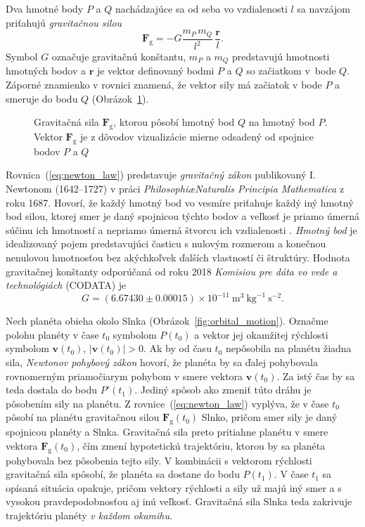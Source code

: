 \documentclass[a4paper, 12pt]{book}
\newcommand{\gidx}{\mathrm g}
\let\vec\mathbf
\begin{document}
Dva hmotné body $P$ a $Q$ nachádzajúce sa od seba vo vzdialenosti $l$ sa 
navzájom priťahujú \emph{gravitačnou silou}
%
\begin{equation}
\label{eq:newton_law}
\vec F_\gidx = -G \frac{m_P \, m_Q}{l^2} \, \frac{\vec r}{l}{.}
\end{equation}
%
Symbol $G$ označuje gravitačnú konštantu, $m_P$ a $m_Q$ predstavujú hmotnosti 
hmotných bodov a $\vec r$ je vektor definovaný bodmi $P$ a $Q$ so začiatkom 
v~bode $Q$.  Záporné znamienko v rovnici znamená, že vektor sily má začiatok 
v bode $P$ a smeruje do bodu $Q$ (Obrázok~\ref{fig:newton_law}).

\begin{figure}[b]
\centering

\caption{Gravitačná sila $\vec F_\gidx$, ktorou pôsobí hmotný bod $Q$ na hmotný 
bod $P$.  Vektor $\vec F_\gidx$ je z dôvodov vizualizácie mierne odsadený od 
spojnice bodov $P$ a $Q$}
\label{fig:newton_law}
\end{figure}

Rovnica~(\ref{eq:newton_law}) predstavuje \emph{gravitačný zákon} 
publikovaný I. Newtonom (1642--1727) v práci \emph{Philosophi\ae Naturalis 
Principia Mathematica} z roku 1687.  Hovorí, že každý hmotný bod vo vesmíre 
priťahuje každý iný hmotný bod silou, ktorej smer je daný spojnicou týchto 
bodov a veľkosť je priamo úmerná súčinu ich hmotností a nepriamo úmerná štvorcu 
ich vzdialenosti \citep{Kellogg1967}.  \emph{Hmotný bod} je idealizovaný pojem 
predstavujúci časticu s nulovým rozmerom a konečnou nenulovou hmotnosťou bez 
akýchkoľvek ďalších vlastností či štruktúry.  Hodnota gravitačnej konštanty 
odporúčaná od roku 2018 \emph{Komisiou pre dáta vo vede a technológiách} 
(CODATA) je
%
\begin{equation}
G = (6.67430 \pm 0.00015) \times 10^{-11} \ \mathrm{m}^3 \ \mathrm{kg}^{-1} 
\ \mathrm{s}^{-2}{.}
\end{equation}

Nech planéta obieha okolo Slnka (Obrázok~\ref{fig:orbital_motion}).  Označme 
polohu planéty v čase $t_0$ symbolom $P(t_0)$ a vektor jej okamžitej rýchlosti 
symbolom $\vec v(t_0)$, $| \vec v(t_0) | > 0$.  Ak by od času $t_0$ nepôsobila 
na planétu žiadna sila, \emph{Newtonov pohybový zákon} hovorí, že planéta by sa 
ďalej pohybovala rovnomerným priamočiarym pohybom v smere vektora $\vec 
v(t_0)$.  Za istý čas by sa teda dostala do bodu $P'(t_1)$.  Jediný spôsob ako 
zmeniť túto dráhu je pôsobením sily na planétu.  
Z rovnice~(\ref{eq:newton_law}) vyplýva, že v čase $t_0$ pôsobí na planétu 
gravitačnou silou $\vec F_\gidx(t_0)$ Slnko, pričom smer sily je daný spojnicou 
planéty a Slnka.  Gravitačná sila preto pritiahne planétu v smere vektora $\vec 
F_\gidx(t_0)$, čím zmení hypotetickú trajektóriu, ktorou by sa planéta 
pohybovala bez pôsobenia tejto sily.  V kombinácii s vektorom rýchlosti 
gravitačná sila spôsobí, že planéta sa dostane do bodu $P(t_1)$.  V čase $t_1$ 
sa opísaná situácia opakuje, pričom vektory rýchlosti a sily už majú iný smer 
a s vysokou pravdepodobnosťou aj inú veľkosť.  Gravitačná sila Slnka teda 
zakrivuje trajektóriu planéty \emph{v každom okamihu}.
\end{document}
